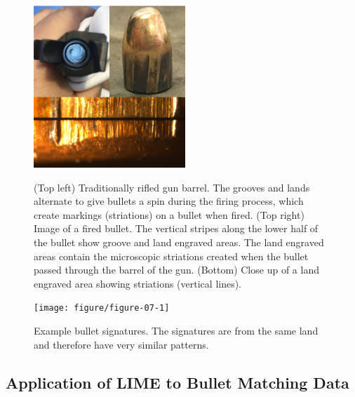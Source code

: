\documentclass[AMS,STIX2COL]{WileyNJD-v2}\usepackage[]{graphicx}\usepackage[]{color}
\newenvironment{knitrout}{}{} %
\begin{document}
\begin{figure}[!t]
\centering
\begin{knitrout}
\color{fgcolor}

{\centering \includegraphics[width=2.25in]{figure-static/figure-06-1} 

}



\end{knitrout}
\caption{(Top left) Traditionally rifled gun barrel. The grooves and lands alternate to give bullets a spin during the firing process, which create markings (striations) on a bullet when fired. (Top right) Image of a fired bullet. The vertical stripes along the lower half of the bullet show groove and land engraved areas. The land engraved areas contain the microscopic striations created when the bullet passed through the barrel of the gun. (Bottom) Close up of a land engraved area showing striations (vertical lines).}
\label{fig:figure-06}

\vspace*{\floatsep}

\begin{knitrout}
\color{fgcolor}

{\centering \texttt{[image: figure/figure-07-1]} 

}



\end{knitrout}
\caption{Example bullet signatures. The  signatures are from  the same land and therefore have very similar patterns. }
\label{fig:figure-07}
\end{figure}

\subsection{Application of LIME to Bullet Matching Data}
\end{document}

